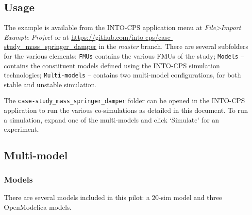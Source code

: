 \subsection{Usage}
\label{sec:masspringdamper_usage}

The example is available from the INTO-CPS application menu at \emph{File>Import Example Project} or at \url{https://github.com/into-cps/case-study\_mass\_springer\_damper} in the \emph{master} branch. There are several subfolders for the various elements: \texttt{FMUs} contains the various FMUs of the study; \texttt{Models} -- contains the constituent models defined using the INTO-CPS simulation technologies; \texttt{Multi-models} -- contains two multi-model configurations, for both stable and unstable simulation.

The \texttt{case-study\_mass\_springer\_damper} folder can be opened in the INTO-CPS application to run the various co-simulations as detailed in this document. To run a simulation, expand one of the multi-models and click `Simulate' for an experiment. 

\subsection{Multi-model}
\label{sec:singletank_into_mm}

\subsubsection{Models}
\label{sec:singletank_into_models}

There are several models included in this pilot: a 20-sim model and three OpenModelica models.

